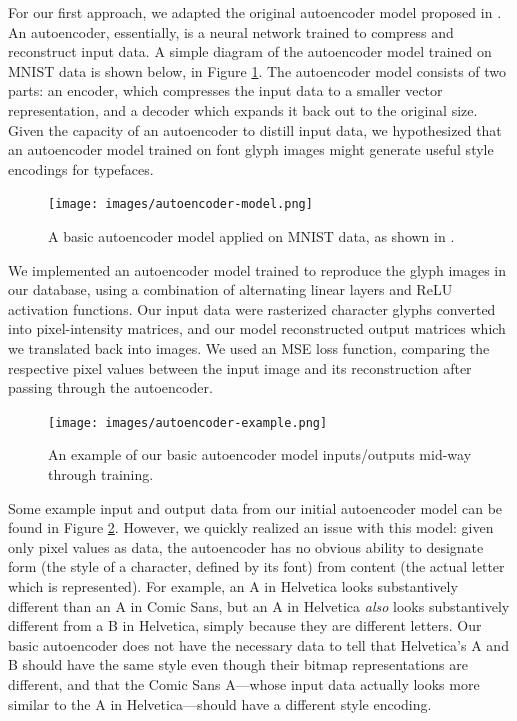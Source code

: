 For our first approach, we adapted the original autoencoder model proposed in \cite{rumelhart1986}. An autoencoder, essentially, is a neural network trained to compress and reconstruct input data. A simple diagram of the autoencoder model trained on MNIST data is shown below, in Figure \ref{fig:autoencoder-model}. The autoencoder model consists of two parts: an encoder, which compresses the input data to a smaller vector representation, and a decoder which expands it back out to the original size. Given the capacity of an autoencoder to distill input data, we hypothesized that an autoencoder model trained on font glyph images might generate useful style encodings for typefaces.

\begin{figure}[h]
    \centering
    \texttt{[image: images/autoencoder-model.png]}
    \caption{A basic autoencoder model applied on MNIST data, as shown in \cite{bank2021autoencoders}.}
    \label{fig:autoencoder-model}
\end{figure}

We implemented an autoencoder model trained to reproduce the glyph images in our database, using a combination of alternating linear layers and ReLU activation functions. Our input data were rasterized character glyphs converted into pixel-intensity matrices, and our model reconstructed output matrices which we translated back into images. We used an MSE loss function, comparing the respective pixel values between the input image and its reconstruction after passing through the autoencoder.

\begin{figure}[h]
    \centering
    \texttt{[image: images/autoencoder-example.png]}
    \caption{An example of our basic autoencoder model inputs/outputs mid-way through training.}
    \label{fig:autoencoder-example}
\end{figure}

Some example input and output data from our initial autoencoder model can be found in Figure \ref{fig:autoencoder-example}. However, we quickly realized an issue with this model: given only pixel values as data, the autoencoder has no obvious ability to designate form (the style of a character, defined by its font) from content (the actual letter which is represented). For example, an { A} in Helvetica looks substantively different than an { A} in Comic Sans, but an { A} in Helvetica \textit{also} looks substantively different from a { B} in Helvetica, simply because they are different letters. Our basic autoencoder does not have the necessary data to tell that Helvetica's { A} and { B} should have the same style even though their bitmap representations are different, and that the Comic Sans { A}—whose input data actually looks more similar to the { A} in Helvetica—should have a different style encoding.

